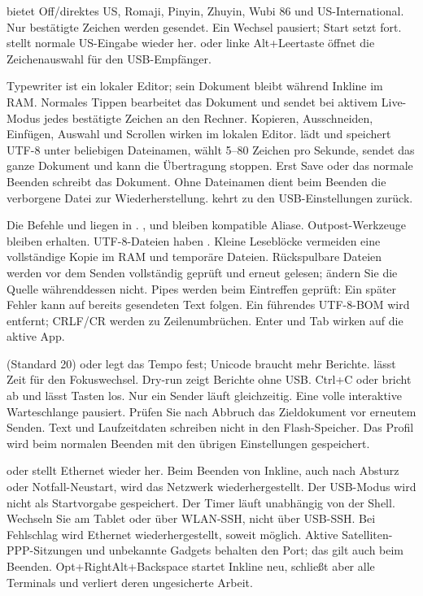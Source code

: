  bietet Off/direktes US, Romaji, Pinyin, Zhuyin, Wubi 86 und
US-International. Nur bestätigte Zeichen werden gesendet. Ein Wechsel pausiert;
Start setzt fort.  stellt normale US-Eingabe wieder her. 
oder linke Alt+Leertaste öffnet die Zeichenauswahl für den USB-Empfänger.

Typewriter ist ein lokaler Editor; sein Dokument bleibt während Inkline im RAM.
Normales Tippen bearbeitet das Dokument und sendet bei aktivem Live-Modus jedes
bestätigte Zeichen an den Rechner. Kopieren, Ausschneiden, Einfügen, Auswahl und
Scrollen wirken im lokalen Editor.  lädt und speichert UTF-8
unter beliebigen Dateinamen, wählt 5--80 Zeichen pro Sekunde, sendet das ganze
Dokument und kann die Übertragung stoppen. Erst Save oder das normale Beenden
schreibt das Dokument. Ohne Dateinamen dient beim Beenden die verborgene Datei
 zur Wiederherstellung. 
kehrt zu den USB-Einstellungen zurück.

Die Befehle  und  liegen in
. ,  und
 bleiben kompatible Aliase. Outpost-Werkzeuge bleiben erhalten.
\UsbExamples
UTF-8-Dateien haben . Kleine Leseblöcke vermeiden
eine vollständige Kopie im RAM und temporäre Dateien. Rückspulbare Dateien werden
vor dem Senden vollständig geprüft und erneut gelesen; ändern Sie die Quelle
währenddessen nicht. Pipes werden beim Eintreffen geprüft: Ein später Fehler kann
auf bereits gesendeten Text folgen. Ein führendes UTF-8-BOM wird entfernt;
CRLF/CR werden zu Zeilenumbrüchen. Enter und Tab wirken auf die aktive App.

 (Standard 20) oder  legt das Tempo fest; Unicode
braucht mehr Berichte.  lässt Zeit für den Fokuswechsel.
Dry-run zeigt Berichte ohne USB. Ctrl+C oder  bricht ab und lässt
Tasten los. Nur ein Sender läuft gleichzeitig. Eine volle interaktive Warteschlange
pausiert. Prüfen Sie nach Abbruch das Zieldokument vor erneutem Senden.
Text und Laufzeitdaten schreiben nicht in den Flash-Speicher. Das Profil wird
beim normalen Beenden mit den übrigen Einstellungen gespeichert.

 oder  stellt Ethernet wieder her.
Beim Beenden von Inkline, auch nach Absturz oder Notfall-Neustart, wird das
Netzwerk wiederhergestellt. Der USB-Modus wird nicht als Startvorgabe gespeichert.
\UsbRecoveryExample
Der Timer läuft unabhängig von der Shell. Wechseln Sie am Tablet oder über WLAN-SSH,
nicht über USB-SSH. Bei Fehlschlag wird Ethernet wiederhergestellt, soweit möglich.
Aktive Satelliten-PPP-Sitzungen und unbekannte Gadgets behalten den Port; das gilt
auch beim Beenden. Opt+RightAlt+Backspace startet Inkline neu, schließt aber alle
Terminals und verliert deren ungesicherte Arbeit.

